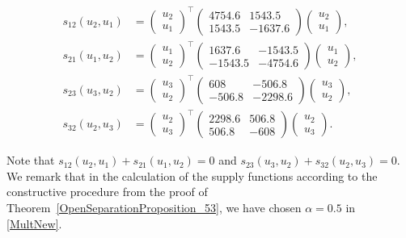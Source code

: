 \documentclass[11pt,a4paper,oneside,DIV=12,headings=small]{scrartcl}
\theoremstyle{plain}
\begin{document}
\begin{align}
s_{12}(u_2,u_1)&=\begin{pmatrix} u_2 \\ u_1 \end{pmatrix}^\top
\begin{pmatrix} 4754.6 & 1543.5 \\ 1543.5 & -1637.6  \end{pmatrix}
\begin{pmatrix} u_2 \\ u_1 \end{pmatrix},\\
s_{21}(u_1,u_2)&=\begin{pmatrix} u_1 \\ u_2 \end{pmatrix}^\top
\begin{pmatrix} 1637.6 & -1543.5 \\ -1543.5 & -4754.6  \end{pmatrix}
\begin{pmatrix} u_1 \\ u_2 \end{pmatrix}, \\
s_{23}(u_3,u_2)&= \begin{pmatrix} u_3 \\ u_2 \end{pmatrix}^\top 
\begin{pmatrix} 608 & -506.8 \\ -506.8 & -2298.6  \end{pmatrix}
\begin{pmatrix} u_3 \\ u_2 \end{pmatrix}, \\
s_{32}(u_2,u_3)&=\begin{pmatrix} u_2 \\ u_3 \end{pmatrix}^\top
\begin{pmatrix} 2298.6 & 506.8 \\ 506.8 & -608  \end{pmatrix}
\begin{pmatrix} u_2 \\ u_3 \end{pmatrix}.
\end{align}

Note that $s_{12}(u_2,u_1)+s_{21}(u_1,u_2)=0$ and $s_{23}(u_3,u_2)+s_{32}(u_2,u_3)=0$. 
We remark that in the calculation of the supply functions according to the constructive procedure from the proof of Theorem~\ref{OpenSeparationProposition_53}, we have chosen $\alpha=0.5$ in \eqref{MultNew}. 
\end{document}
